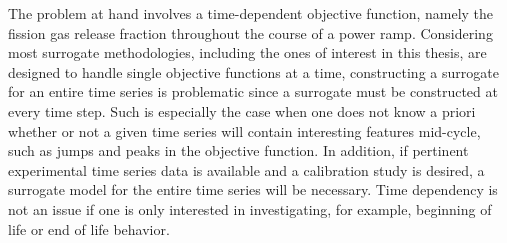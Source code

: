 The problem at hand involves a time-dependent objective function, namely the fission gas release fraction throughout the course of a power ramp. Considering most surrogate methodologies, including the ones of interest in this thesis, are designed to handle single objective functions at a time, constructing a surrogate for an entire time series is problematic since a surrogate must be constructed at every time step. Such is especially the case when one does not know a priori whether or not a given time series will contain interesting features mid-cycle, such as jumps and peaks in the objective function. In addition, if pertinent experimental time series data is available and a calibration study is desired, a surrogate model for the entire time series will be necessary. Time dependency is not an issue if one is only interested in investigating, for example, beginning of life or end of life behavior.  
 
